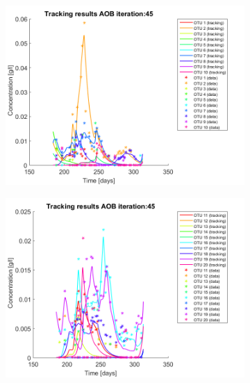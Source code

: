 \documentclass[3p,times]{elsarticle}
\begin{document}
\begin{figure}[h]
	\centering
	\begin{subfigure}{0.45 \textwidth}
		\includegraphics[width =\textwidth]{Application//191218_Reactor_A_AOB_iter_45_plot_1}
	\end{subfigure}
	\begin{subfigure}{0.45 \textwidth}
	\includegraphics[width =\textwidth]{Application//191218_Reactor_A_AOB_iter_45_plot_2}
	\end{subfigure}
	\begin{subfigure}{0.45 \textwidth}

\end{subfigure}
\end{figure}
\end{document}
